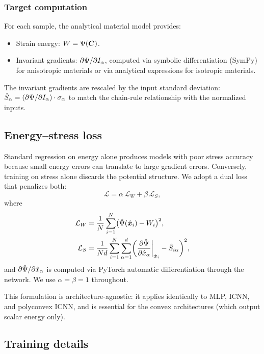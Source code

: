 \subsubsection{Target computation}

For each sample, the analytical material model provides:
\begin{itemize}
  \item Strain energy: $W = \Psi(\bm{C})$.
  \item Invariant gradients: $\partial \Psi / \partial I_\alpha$, computed via
    symbolic differentiation (SymPy) for anisotropic materials or via
    analytical expressions for isotropic materials.
\end{itemize}
The invariant gradients are rescaled by the input standard deviation:
$\hat{S}_\alpha = (\partial\Psi/\partial I_\alpha) \cdot \sigma_\alpha$ to
match the chain-rule relationship with the normalized inputs.

\subsection{Energy--stress loss}
\label{sec:training:loss}

Standard regression on energy alone produces models with poor stress accuracy
because small energy errors can translate to large gradient errors.  Conversely,
training on stress alone discards the potential structure.  We adopt a dual
loss that penalizes both:
\begin{equation}
  \mathcal{L} = \alpha\,\mathcal{L}_W + \beta\,\mathcal{L}_S,
  \label{eq:energy_stress_loss}
\end{equation}
where
\begin{align}
  \mathcal{L}_W &= \frac{1}{N}\sum_{i=1}^{N}
    \bigl(\hat{\Psi}(\hat{\bm{x}}_i) - W_i\bigr)^2, \label{eq:loss_energy} \\
  \mathcal{L}_S &= \frac{1}{Nd}\sum_{i=1}^{N}\sum_{\alpha=1}^{d}
    \biggl(\frac{\partial \hat{\Psi}}{\partial \hat{x}_\alpha}\bigg|_{\hat{\bm{x}}_i}
    - \hat{S}_{i\alpha}\biggr)^2, \label{eq:loss_stress}
\end{align}
and $\partial\hat{\Psi}/\partial\hat{x}_\alpha$ is computed via PyTorch
automatic differentiation through the network.  We use $\alpha = \beta = 1$
throughout.

This formulation is architecture-agnostic: it applies identically to MLP,
ICNN, and polyconvex ICNN, and is essential for the convex architectures
(which output scalar energy only).

\subsection{Training details}
\label{sec:training:details}

